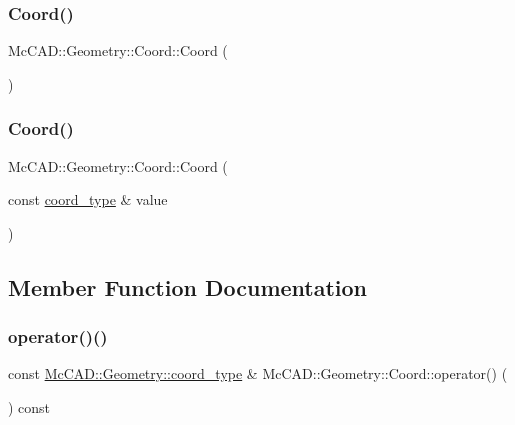 \subsubsection{\texorpdfstring{Coord()}{Coord()}\hspace{0.1cm}{\footnotesize\ttfamily [3/4]}}
{\footnotesize\ttfamily Mc\+C\+A\+D\+::\+Geometry\+::\+Coord\+::\+Coord (\begin{DoxyParamCaption}{ }\end{DoxyParamCaption})}

\mbox{\label{classMcCAD_1_1Geometry_1_1Coord_ad7eda8b6ae03bf1d59b802295448129a}} 
\subsubsection{\texorpdfstring{Coord()}{Coord()}\hspace{0.1cm}{\footnotesize\ttfamily [4/4]}}
{\footnotesize\ttfamily Mc\+C\+A\+D\+::\+Geometry\+::\+Coord\+::\+Coord (\begin{DoxyParamCaption}\item[{const \hyperlink{namespaceMcCAD_1_1Geometry_ac043b37a4a7e849fca22869e1982d2f8}{coord\+\_\+type} \&}]{value }\end{DoxyParamCaption})}



\subsection{Member Function Documentation}
\mbox{\label{classMcCAD_1_1Geometry_1_1Coord_a8d470980d3b25c681ac82bbc66825312}} 
\subsubsection{\texorpdfstring{operator()()}{operator()()}\hspace{0.1cm}{\footnotesize\ttfamily [1/2]}}
{\footnotesize\ttfamily const \hyperlink{namespaceMcCAD_1_1Geometry_ac043b37a4a7e849fca22869e1982d2f8}{Mc\+C\+A\+D\+::\+Geometry\+::coord\+\_\+type} \& Mc\+C\+A\+D\+::\+Geometry\+::\+Coord\+::operator() (\begin{DoxyParamCaption}{ }\end{DoxyParamCaption}) const}



